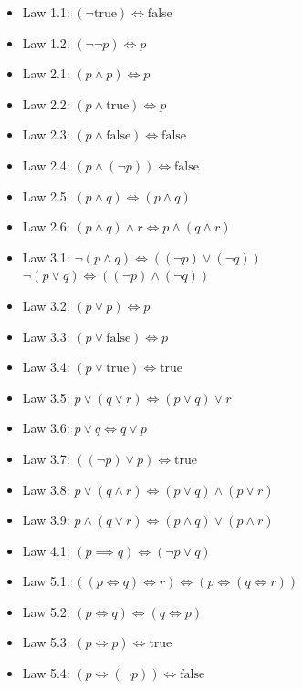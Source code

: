 \documentclass[twocolumn]{article}
\begin{document}
\begin{itemize}
    \item Law 1.1: $(\neg\text{true}) \Longleftrightarrow \text{false}$
    \item Law 1.2: $(\neg\neg p) \Longleftrightarrow p$

    \item Law 2.1: $(p \wedge p) \Longleftrightarrow p$
    \item Law 2.2: $(p \wedge \text{true}) \Longleftrightarrow p$
    \item Law 2.3: $(p \wedge \text{false}) \Longleftrightarrow \text{false}$
    \item Law 2.4: $(p \wedge (\neg p)) \Longleftrightarrow \text{false}$
    \item Law 2.5: $(p \wedge q) \Longleftrightarrow(p \wedge q)$
    \item Law 2.6: $(p \wedge q ) \wedge r \Longleftrightarrow p \wedge (q \wedge r)$

    \item Law 3.1: $\neg(p \wedge q) \Longleftrightarrow ((\neg p) \vee (\neg q))$ \\
                        $\neg(p \vee q) \Longleftrightarrow ((\neg p) \wedge (\neg q))$
    \item Law 3.2: $(p \vee p) \Longleftrightarrow p$
    \item Law 3.3: $(p \vee \text{false}) \Longleftrightarrow p$
    \item Law 3.4: $(p \vee \text{true}) \Longleftrightarrow \text{true}$
    \item Law 3.5: $p \vee (q \vee r) \Longleftrightarrow (p \vee q) \vee r$
    \item Law 3.6: $ p \vee q \Longleftrightarrow q \vee p$
    \item Law 3.7: $((\neg p) \vee p) \Longleftrightarrow \text{true}$
    \item Law 3.8: $p \vee (q \wedge r) \Longleftrightarrow (p \vee q) \wedge (p \vee r)$
    \item Law 3.9: $p \wedge (q \vee r) \Longleftrightarrow (p \wedge q) \vee (p \wedge r)$
    
    \item Law 4.1: $ (p \implies q) \Longleftrightarrow ( \neg p \vee q)$

    \item Law 5.1: $((p \Longleftrightarrow q) \Longleftrightarrow r) \Longleftrightarrow (p \Longleftrightarrow (q \Longleftrightarrow r))$
    \item Law 5.2: $(p \Longleftrightarrow q) \Longleftrightarrow (q \Longleftrightarrow p)$
    \item Law 5.3: $(p \Longleftrightarrow p) \Longleftrightarrow \text{true}$
    \item Law 5.4: $(p \Longleftrightarrow (\neg p)) \Longleftrightarrow \text{false}$
\end{itemize}
\end{document}

